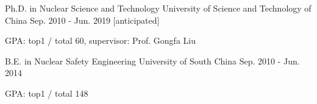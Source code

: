 

\begin{cventries}

\cventry
{Ph.D. in Nuclear Science and Technology} %
{University of Science and Technology of China} %
{} %
{Sep. 2010 - Jun. 2019 [anticipated]} %
{
	\begin{cvitems} %
		\item {GPA: top1 / total 60, supervisor: Prof. Gongfa Liu}
	\end{cvitems}
}

  \cventry
    {B.E. in Nuclear Safety Engineering} %
    {University of South China} %
    {} %
    {Sep. 2010 - Jun. 2014} %
    {
      \begin{cvitems} %
        \item {GPA: top1 / total 148}
      \end{cvitems}
    }

\end{cventries}
